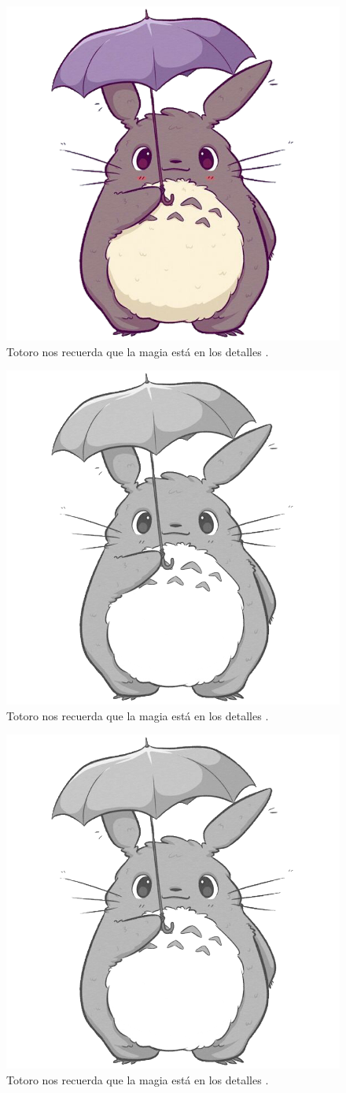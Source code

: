 \ifPDF
\begin{figure}[!ht]
	\centering
	\includegraphics[width=.5\textwidth]{./media/avatar.png}
	\caption{Totoro nos recuerda que la magia está en los detalles \parencite{@6404-HAYAO2005}.}\label{figura3-1}
\end{figure}
\else
\ifBNPDF
\begin{figure}[!ht]
	\centering
	\includegraphics[width=.5\textwidth]{./media/avatar2.png}
	\caption{Totoro nos recuerda que la magia está en los detalles \parencite{@6404-HAYAO2005}.}\label{figura3-1}
\end{figure}
\fi
\else
\ifPNGEPUB
\begin{figure}[!ht]
	\centering
	\includegraphics[width=.5\textwidth]{./media/avatar2.png}
	\caption{Totoro nos recuerda que la magia está en los detalles \parencite{@6404-HAYAO2005}.}\label{figura3-1}
\end{figure}
\fi
\fi

